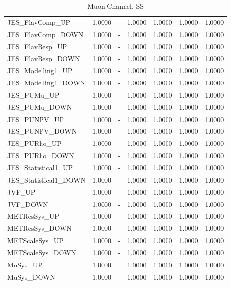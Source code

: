 \documentclass[11pt,oneside,a4paper]{article}
\begin{document}
\begin{table}
\begin{tabular}{lrrrrrr}
JES\_FlavComp\_UP & 1.0000 & - & 1.0000 & 1.0000 & 1.0000 & 1.0000 \\
JES\_FlavComp\_DOWN & 1.0000 & - & 1.0000 & 1.0000 & 1.0000 & 1.0000 \\
JES\_FlavResp\_UP & 1.0000 & - & 1.0000 & 1.0000 & 1.0000 & 1.0000 \\
JES\_FlavResp\_DOWN & 1.0000 & - & 1.0000 & 1.0000 & 1.0000 & 1.0000 \\
JES\_Modelling1\_UP & 1.0000 & - & 1.0000 & 1.0000 & 1.0000 & 1.0000 \\
JES\_Modelling1\_DOWN & 1.0000 & - & 1.0000 & 1.0000 & 1.0000 & 1.0000 \\
JES\_PUMu\_UP & 1.0000 & - & 1.0000 & 1.0000 & 1.0000 & 1.0000 \\
JES\_PUMu\_DOWN & 1.0000 & - & 1.0000 & 1.0000 & 1.0000 & 1.0000 \\
JES\_PUNPV\_UP & 1.0000 & - & 1.0000 & 1.0000 & 1.0000 & 1.0000 \\
JES\_PUNPV\_DOWN & 1.0000 & - & 1.0000 & 1.0000 & 1.0000 & 1.0000 \\
JES\_PURho\_UP & 1.0000 & - & 1.0000 & 1.0000 & 1.0000 & 1.0000 \\
JES\_PURho\_DOWN & 1.0000 & - & 1.0000 & 1.0000 & 1.0000 & 1.0000 \\
JES\_Statistical1\_UP & 1.0000 & - & 1.0000 & 1.0000 & 1.0000 & 1.0000 \\
JES\_Statistical1\_DOWN & 1.0000 & - & 1.0000 & 1.0000 & 1.0000 & 1.0000 \\
JVF\_UP & 1.0000 & - & 1.0000 & 1.0000 & 1.0000 & 1.0000 \\
JVF\_DOWN & 1.0000 & - & 1.0000 & 1.0000 & 1.0000 & 1.0000 \\
METResSys\_UP & 1.0000 & - & 1.0000 & 1.0000 & 1.0000 & 1.0000 \\
METResSys\_DOWN & 1.0000 & - & 1.0000 & 1.0000 & 1.0000 & 1.0000 \\
METScaleSys\_UP & 1.0000 & - & 1.0000 & 1.0000 & 1.0000 & 1.0000 \\
METScaleSys\_DOWN & 1.0000 & - & 1.0000 & 1.0000 & 1.0000 & 1.0000 \\
MuSys\_UP & 1.0000 & - & 1.0000 & 1.0000 & 1.0000 & 1.0000 \\
MuSys\_DOWN & 1.0000 & - & 1.0000 & 1.0000 & 1.0000 & 1.0000 \\
\end{tabular}
\caption{Muon Channel, SS}
\end{table}
\end{document}
